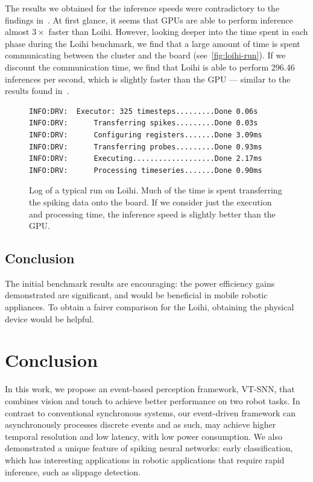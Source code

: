 \documentclass[fyp]{socreport}
\begin{document}
The results we obtained for the inference speeds were contradictory to the
findings in~\cite{blouw18_bench_keywor_spott_effic_neurom_hardw}. At first
glance, it seems that GPUs are able to perform inference almost $3\times$ faster
than Loihi. However, looking deeper into the time spent in each phase during the
Loihi benchmark, we find that a large amount of time is spent communicating
between the cluster and the board (see~\autoref{fig:loihi-run}). If we
discount the communication time, we find that Loihi is able to perform 296.46
inferences per second, which is slightly faster than the GPU --- similar to the
results found in~\cite{blouw18_bench_keywor_spott_effic_neurom_hardw}.

\begin{figure}
\begin{verbatim}
INFO:DRV:  Executor: 325 timesteps.........Done 0.06s
INFO:DRV:      Transferring spikes.........Done 0.03s
INFO:DRV:      Configuring registers.......Done 3.09ms
INFO:DRV:      Transferring probes.........Done 0.93ms
INFO:DRV:      Executing...................Done 2.17ms
INFO:DRV:      Processing timeseries.......Done 0.90ms
\end{verbatim}
  \caption{Log of a typical run on Loihi. Much of the time is spent transferring
    the spiking data onto the board. If we consider just the execution and
    processing time, the inference speed is slightly better than the GPU.\label{fig:loihi-run}}
\end{figure}

\section{Conclusion}

The initial benchmark results are encouraging: the power efficiency gains
demonstrated are significant, and would be beneficial in mobile robotic
appliances. To obtain a fairer comparison for the Loihi, obtaining the physical
device would be helpful.

\chapter{Conclusion\label{cha:conclusion}}

In this work, we propose an event-based perception framework, VT-SNN, that
combines vision and touch to achieve better performance on two robot tasks. In
contrast to conventional synchronous systems, our event-driven framework can
asynchronously processes discrete events and as such, may achieve higher
temporal resolution and low latency, with low power consumption. We also
demonstrated a unique feature of spiking neural networks: early classification,
which has interesting applications in robotic applications that require rapid
inference, such as slippage detection.
\end{document}
